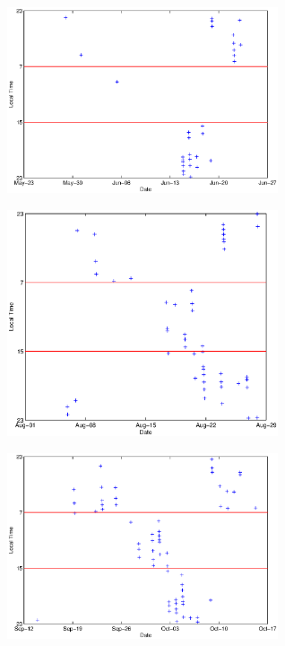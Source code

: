 \documentclass[a4paper,11pt]{article}
\begin{document}
\begin{figure}[htbp]
\begin{minipage}{1.0\hsize}
\begin{center}
\includegraphics[width =8cm]{PlotTime2011_1.eps}
\\
\end{center}
\end{minipage}
\begin{minipage}{1.0\hsize}
\begin{center}
\includegraphics[width =8cm]{PlotTime2011_2.eps}
\\
\end{center}
\end{minipage}
\begin{minipage}{1.0\hsize}
\begin{center}
\includegraphics[width =8cm]{PlotTime2011_3.eps}

\end{center}
\end{minipage}
\end{figure}
\end{document}
